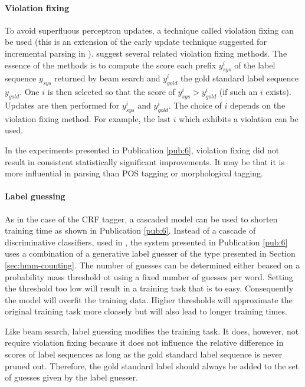 \paragraph{Violation fixing} To avoid superfluous perceptron updates,
a technique called violation fixing can be used \citep{Huang2012}
(this is an extension of the early update technique suggested for
incremental parsing in \cite{Collins2004}). \cite{Huang2012} suggest
several related violation fixing methods. The essence of the methods
is to compute the score each prefix $y_{sys}^i$ of the label sequence
$y_{sys}$ returned by beam search and $y_{gold}^i$ the gold standard
label sequence $y_{gold}$. One $i$ is then selected so that the score
of $y_{sys}^i > y_{gold}^i$ (if such an $i$ exists). Updates are then
performed for $y_{sys}^i$ and $y_{gold}^i$. The choice of $i$ depends
on the violation fixing method. For example, the last $i$ which
exhibits a violation can be used.

In the experiments presented in Publication \ref{pub:6}, violation
fixing did not result in consistent statistically significant
improvements. It may be that it is more influential in parsing than
POS tagging or morphological tagging.

\paragraph{Label guessing} As in the case of the CRF tagger, a
cascaded model can be used to shorten training time as shown in Publication \ref{pub:6}. Instead of a cascade of discriminative
classifiers, used in \citep{Muller2013}, the system presented in Publication \ref{pub:6} uses a
combination of a generative label guesser of the type presented in
Section \ref{sec:hmm-counting}. The number of guesses can be
determined either beased on a probability mass threshold ot using a
fixed number of guesses per word. Setting the threshold too low will
result in a training task that is to easy. Consequently the model will
overfit the training data. Higher thresholds will approximate the
original training task more cloasely but will also lead to longer
training times.

Like beam search, label guessing modifies the training task. It does,
however, not require violation fixing because it does not influence
the relative difference in scores of label sequences as long as the
gold standard label sequence is never pruned out. Therefore, the gold
standard label should always be added to the set of guesses given by
the label guesser.

